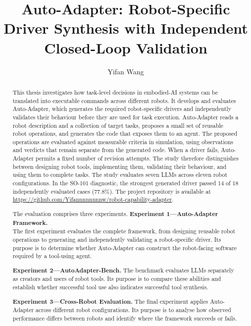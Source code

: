\makeatletter
\renewcommand {\@degree@string} {Master of Science}
\makeatother

\title{Auto-Adapter: Robot-Specific Driver Synthesis with Independent Closed-Loop Validation}
\author{Yifan Wang}

\maketitle
\makedeclaration

\begin{abstract}
This thesis investigates how task-level decisions in embodied-AI systems can
be translated into executable commands across different robots. It develops
and evaluates Auto-Adapter, which generates the required robot-specific drivers
and independently validates their behaviour before they are used for task
execution.
Auto-Adapter reads a robot description and a collection of target tasks,
proposes a small set of reusable robot operations, and generates the code that
exposes them to an agent. The proposed operations are evaluated against
measurable criteria in simulation, using observations and verdicts that remain
separate from the generated code. When a driver fails, Auto-Adapter permits a
fixed number of revision attempts. The study therefore distinguishes between
designing robot tools, implementing them, validating their behaviour, and
using them to complete tasks. The study evaluates seven LLMs across eleven
robot configurations. In the SO-101 diagnostic, the strongest generated driver
passed 14 of 18 independently evaluated cases (77.8\%). The project repository
is available at \url{https://github.com/Yifannnnnnnnw/robot-capability-adapter}.

The evaluation comprises three experiments.
\textbf{Experiment 1---Auto-Adapter Framework.}\\
The first experiment evaluates
the complete framework, from designing reusable robot operations to generating
and independently validating a robot-specific driver. Its purpose is to
determine whether Auto-Adapter can construct the robot-facing software required
by a tool-using agent.

\textbf{Experiment 2---AutoAdapter-Bench.} The benchmark evaluates LLMs
separately as creators and users of robot tools. Its purpose is to compare these
abilities and establish whether successful tool use also indicates successful
tool synthesis.

\textbf{Experiment 3---Cross-Robot Evaluation.} The final experiment applies
Auto-Adapter across different robot configurations. Its purpose is to analyse
how observed performance differs between robots and identify where the
framework succeeds or fails.



\end{abstract}
